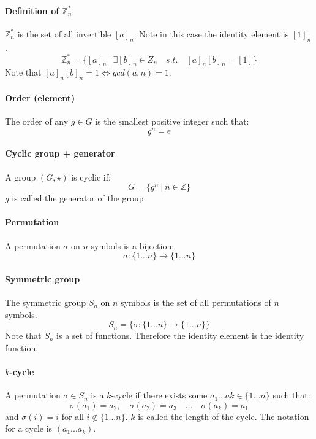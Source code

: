 \documentclass{article}
\newcommand{\Z}{\mathbb{Z}}
\begin{document}
\paragraph{Definition of $ \Z_{n}^{*} $}
$ \Z_{n}^{*} $ is the set of all invertible $ [a]_{n} $. Note in this case the identity element is $ [1]_{n} $.
\begin{equation}
\Z_{n}^{*} = \{[a]_{n} \ | \ \exists [b]_{n} \in Z_{n} \quad s.t. \quad [a]_{n}[b]_{n} = [1]\}
\end{equation}
Note that $ [a]_{n}[b]_{n} = 1 \Leftrightarrow gcd(a, n) = 1 $.
\paragraph{Order (element)}
The order of any $ g \in G $ is the smallest positive integer such that:
\begin{equation}
g^{n} = e
\end{equation}
\paragraph{Cyclic group + generator}
A group $ (G, \star) $ is cyclic if:
\begin{equation}
G = \{ g^{n} \ | \ n \in \Z \} 
\end{equation}
$ g $ is called the generator of the group.
\paragraph{Permutation}
A permutation $ \sigma $ on $ n $ symbols is a bijection:
\begin{equation}
\sigma : \{1...n\} \to \{1...n\}
\end{equation}
\paragraph{Symmetric group}
The symmetric group $ S_{n} $ on $ n $ symbols is the set of all permutations of $ n $ symbols.
\begin{equation}
S_{n} = \{\sigma : \{1...n\} \to \{1...n\}\}
\end{equation}
Note that $ S_{n} $ is a set of functions. Therefore the identity element is the identity function.
\paragraph{$ k $-cycle}
A permutation $ \sigma \in S_{n} $ is a $ k $-cycle if there exists some $ a_{1}...a{k}  \in \{1...n\} $ such that:
\begin{equation}
\sigma(a_{1}) = a_{2}, \quad \sigma(a_{2}) = a_{3} \quad ... \quad \sigma(a_{k}) = a_{1}
\end{equation}
and $ \sigma(i) = i $ for all $ i \notin \{1...n\} $. $ k $ is called the length of the cycle. The notation for a cycle is $ (a_{1}...a_{k}) $.
\end{document}
